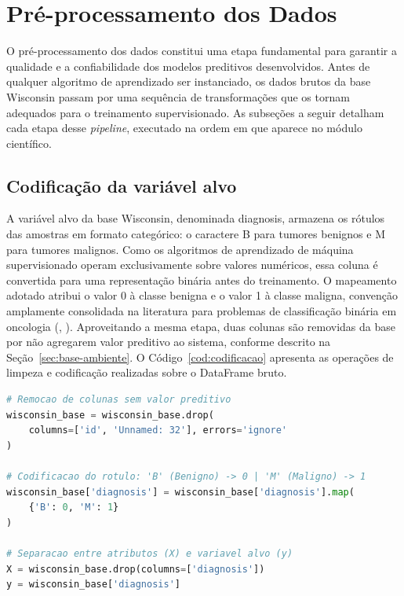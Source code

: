 \documentclass[
    12pt
    ,oneside
    ,a4paper
    ,chapter=TITLE
    ,section=TITLE
    ,sumario=abnt-6027-2012
    ,english,brazil]{abntex2} %
\begin{document}
\section{Pré-processamento dos Dados}
\label{sec:preprocessamento}

O pré-processamento dos dados constitui uma etapa fundamental para garantir a
qualidade e a confiabilidade dos modelos preditivos desenvolvidos. Antes de
qualquer algoritmo de aprendizado ser instanciado, os dados brutos da base
Wisconsin passam por uma sequência de transformações que os tornam adequados
para o treinamento supervisionado. As subseções a seguir detalham cada etapa
desse \textit{pipeline}, executado na ordem em que aparece no módulo científico.

\subsection{Codificação da variável alvo}
\label{subsec:codificacao-alvo}

A variável alvo da base Wisconsin, denominada diagnosis, armazena os rótulos
das amostras em formato categórico: o caractere B para tumores benignos e M
para tumores malignos. Como os algoritmos de aprendizado de máquina supervisionado
operam exclusivamente sobre valores numéricos, essa coluna é convertida para uma
representação binária antes do treinamento. O mapeamento adotado atribui o valor
0 à classe benigna e o valor 1 à classe maligna, convenção amplamente consolidada
na literatura para problemas de classificação binária em oncologia
(, \citeyear{Street1993}). Aproveitando a mesma
etapa, duas colunas são removidas da base por não agregarem valor preditivo ao
sistema, conforme descrito na Seção~\ref{sec:base-ambiente}. O
Código~\ref{cod:codificacao} apresenta as operações de limpeza e codificação
realizadas sobre o DataFrame bruto.

\begin{codigo}[htb]
\begin{lstlisting}[language=Python]
# Remocao de colunas sem valor preditivo
wisconsin_base = wisconsin_base.drop(
    columns=['id', 'Unnamed: 32'], errors='ignore'
)

# Codificacao do rotulo: 'B' (Benigno) -> 0 | 'M' (Maligno) -> 1
wisconsin_base['diagnosis'] = wisconsin_base['diagnosis'].map(
    {'B': 0, 'M': 1}
)

# Separacao entre atributos (X) e variavel alvo (y)
X = wisconsin_base.drop(columns=['diagnosis'])
y = wisconsin_base['diagnosis']
\end{lstlisting}
\fonteautor
\end{codigo}
\end{document}
